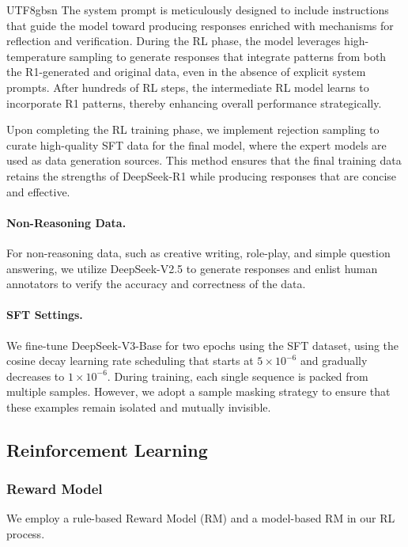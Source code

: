 \documentclass[11pt, a4paper, logo, copyright, nonumbering]{deepseek}
\newcommand{\dsviii}{DeepSeek-V3}
\begin{document}
\begin{CJK*}{UTF8}{gbsn}
The system prompt is meticulously designed to include instructions that guide the model toward producing responses enriched with mechanisms for reflection and verification. 
During the RL phase, the model leverages high-temperature sampling to generate responses that integrate patterns from both the R1-generated and original data, even in the absence of explicit system prompts. 
After hundreds of RL steps, the intermediate RL model learns to incorporate R1 patterns, thereby enhancing overall performance strategically.

Upon completing the RL training phase, we implement rejection sampling to curate high-quality SFT data for the final model, where the expert models are used as data generation sources. 
This method ensures that the final training data retains the strengths of DeepSeek-R1 while producing responses that are concise and effective.

\paragraph{Non-Reasoning Data.} 
For non-reasoning data, such as creative writing, role-play, and simple question answering, we utilize DeepSeek-V2.5 to generate responses and enlist human annotators to verify the accuracy and correctness of the data.

\paragraph{SFT Settings.} 
We fine-tune \dsviii{}-Base for two epochs using the SFT dataset, using the cosine decay learning rate scheduling that starts at $5 \times 10^{-6}$ and gradually decreases to $1 \times 10^{-6}$. 
During training, each single sequence is packed from multiple samples. 
However, we adopt a sample masking strategy to ensure that these examples remain isolated and mutually invisible.

\subsection{Reinforcement Learning}

\subsubsection{Reward Model}

We employ a rule-based Reward Model (RM) and a model-based RM in our RL process.


\end{CJK*}
\end{document}
